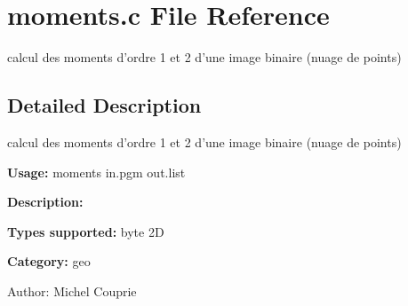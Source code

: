 \section{moments.c File Reference}
\label{moments_8c}
calcul des moments d'ordre 1 et 2 d'une image binaire (nuage de points)  




\label{_details}
\subsection{Detailed Description}
calcul des moments d'ordre 1 et 2 d'une image binaire (nuage de points) 

{\bf Usage:} moments in.pgm out.list

{\bf Description:}

{\bf Types supported:} byte 2D

{\bf Category:} geo

\begin{Desc}
\item[Author:]Michel Couprie \end{Desc}
